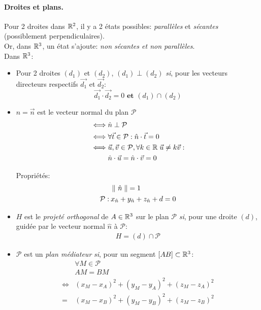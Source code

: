 \documentclass[12pt]{article}
\begin{document}
\paragraph{Droites et plans.}
Pour 2 droites dans $\mathbb{R}^2$, il y a 2 états possibles:
\textit{parallèles} et \textit{sécantes} (possiblement perpendiculaires). \\ 
Or, dans $\mathbb{R}^3$, un état s'ajoute: 
\textit{non sécantes et non parallèles}. \\

Dans $\mathbb{R}^3$:
\begin{itemize}
    \item Pour 2 droites $(d_1)$ et $(d_2)$, $(d_1) \perp (d_2)$ \textit{si},
        pour les vecteurs directeurs respectifs $\vec{d_1}$ et $\vec{d_2}$:
        $$
            \vec{d_1} \cdot \vec{d_2} = 0 
            \textbf{ et } (d_1) \cap (d_2)
        $$

    \item $\hat{n} = \vec{n}$ est le vecteur normal du plan $\mathcal{P}$ $$
    \begin{aligned}
        \iff & \hat{n} \perp \mathcal{P} \\        
        \iff & \forall \vec{t} \in \mathcal{P}: \hat{n} \cdot \vec{t} = 0 \\
        \iff & \vec{u}, \vec{v} \in \mathcal{P}, 
            \forall k \in \mathbb{R} \; \vec{u} \neq k\vec{v}: \\
        &\hat{n} \cdot \vec{u} = \hat{n} \cdot \vec{v} = 0 
    \end{aligned}
    $$
    
    Propriétés: $$
    \begin{aligned}
        & \left\lVert\ \hat{n}\;\right\rVert = 1 \\
        \mathcal{P}: \: & x_{\hat{n}} + y_{\hat{n}} + z_{\hat{n}} + d = 0 \\
    \end{aligned}
    $$ 
    \item $H$ est le \textit{projeté orthogonal} de $A \in \mathbb{R}^3$ 
        sur le plan $\mathcal{P}$ \textit{si}, pour une droite $(d)$,
        guidée par le vecteur normal $\hat{n}$ à $\mathcal{P}$: $$
        \begin{aligned}
            H = (d) \cap \mathcal{P}
        \end{aligned} $$

    \item $\mathcal{P}$ est un \textit{plan médiateur} \textit{si},
        pour un segment $[AB] \subset \mathbb{R}^3$: $$
        \begin{aligned}
            & \forall M \in \mathcal{P} \\
            & AM = BM \\
            \iff & (x_M - x_A)^2 + (y_M - y_A)^2 + (z_M - z_A)^2 \\
               = & (x_M - x_B)^2 + (y_M - y_B)^2 + (z_M - z_B)^2
        \end{aligned} $$

\end{itemize}
\end{document}
